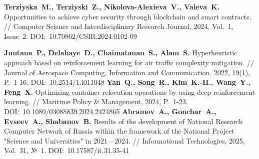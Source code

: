 \begin{thebibliography}{99}
\textbf{Terziyska~M., Terziyski~Z., Nikolova-Alexieva~V., Valeva~K.} Opportunities to achieve cyber security through blockchain and smart contracts. // Computer Science and Interdisciplinary Research Journal, 2024, Vol.~1, Issue~2. DOI:~10.70862/CSIR.2024.0102-09

\textbf{Juntana~P., Delahaye~D., Chaimatanan~S., Alam~S.} Hyperheuristic approach based on reinforcement learning for air traffic complexity mitigation. // Journal of Aerospace Computing, Information and Communication, 2022, 19(1), P.~1-16. DOI:~10.2514/1.i011048
\textbf{Yan~Q., Song~R., Kim~K.-H., Wang~Y., Feng~X.} Optimizing container relocation operations by using deep reinforcement learning. // Maritime Policy \& Management, 2024, P.~1-23. DOI:~10.1080/03088839.2024.2424865
\textbf{Abramov~A., Gonchar~A., Evseev~A., Shabanov~B.} Results of the development of National Research Computer Network of Russia within the framework of the National Project "Science and Universities" in 2021—2024. // Informational Technologies, 2025, Vol.~31, №~1. DOI:~10.17587/it.31.35-41



\end{thebibliography}
